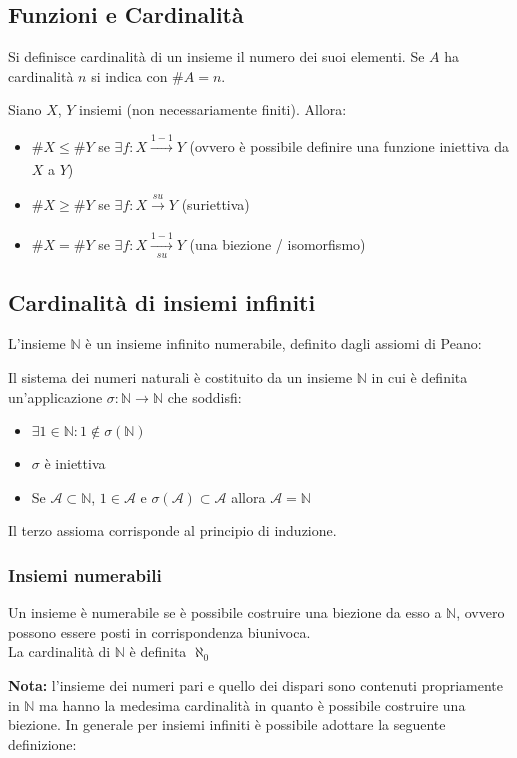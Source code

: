 \documentclass[10pt]{article}
\theoremstyle{plain}
\begin{document}
\subsection{Funzioni e Cardinalità}
\begin{defin}
    Si definisce cardinalità di un insieme il numero dei suoi elementi. Se $A$ ha cardinalità $n$ si indica con $\# A = n$.
\end{defin}
\begin{prop}
    Siano $X$, $Y$ insiemi (non necessariamente finiti). Allora:
    \begin{itemize}[label = $\square$]
        \item $\#X \leq \#Y$ se $\exists f : X \xrightarrow[]{1-1} Y$ (ovvero è possibile definire una funzione iniettiva da $X$ a $Y$)
        \item $\#X \geq \#Y$ se $\exists f : X \xrightarrow[]{su} Y$ (suriettiva)
        \item $\#X = \#Y$ se $\exists f : X \xrightarrow[su]{1-1} Y$ (una biezione / isomorfismo)
    \end{itemize}
\end{prop}

\subsection{Cardinalità di insiemi infiniti}
L'insieme $\mathbb{N}$ è un insieme infinito numerabile, definito dagli assiomi di Peano:
\begin{defin}
    Il sistema dei numeri naturali è costituito da un insieme $\mathbb{N}$ in cui è definita un'applicazione $\sigma : \mathbb{N} \rightarrow \mathbb{N}$ che soddisfi:
    \begin{itemize}
        \item $\exists 1 \in \mathbb{N} : 1 \notin \sigma (\mathbb{N})$
        \item $\sigma$ è iniettiva
        \item Se $\mathcal{A} \subset \mathbb{N}$, $1 \in \mathcal{A}$ e $\sigma(\mathcal{A}) \subset \mathcal{A}$ allora $\mathcal{A} = \mathbb{N}$
    \end{itemize}
    Il terzo assioma corrisponde al principio di induzione.
\end{defin}
\subsubsection*{Insiemi numerabili}
\begin{defin}
    Un insieme è numerabile se è possibile costruire una biezione da esso a $\mathbb{N}$, ovvero possono essere posti in corrispondenza biunivoca.
    \\La cardinalità di $\mathbb{N}$ è definita $\aleph_0$
\end{defin}
\textbf{Nota: } l'insieme dei numeri pari e quello dei dispari sono contenuti propriamente in $\mathbb{N}$ ma hanno la medesima cardinalità in quanto è possibile costruire una biezione. In generale per insiemi infiniti è possibile adottare la seguente definizione:
\end{document}
